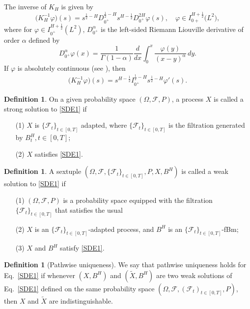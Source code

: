 \documentclass[numbers,compress,v1.0.1]{vmsta}
\theoremstyle{definition}
\newtheorem{definition}[theorem]{Definition}
\begin{document}
The inverse of $K_H$ is given by
%
\[
\bigl(K_H^{-1} \varphi\bigr) (s) = s^{\frac{1}{2}-H}
D_{0^+}^{\frac{1}{2}-H} s^{H-\frac{1}{2}} D_{0^+}^{2H}
\varphi(s), \quad\varphi\in I_{0+}^{H+\frac{1}{2}}\bigl(L^2
\bigr),
\]
%
where for $\varphi\in I_{0^+}^{H+\frac{1}{2}} (L^2)$, $D_{0^+}^{\alpha
}$ is the left-sided Riemann Liouville derivative of order $\alpha$
defined by
%
\[
D_{0^+}^{\alpha} \varphi(x)= \frac{1}{\varGamma(1-\alpha)} \frac{d
}{d x}
\int_0^x \frac{\varphi(y)}{(x-y)^{\alpha}}\,dy.
\]
%
If $\varphi$ is absolutely continuous (see \cite{NO}), then
%
\begin{align}
\label{inverseKH} \bigl(K_H^{-1} \varphi\bigr) (s) =
s^{H-\frac{1}{2}} I_{0^+}^{\frac{1}{2}-H} s^{\frac{1}{2}-H}
\varphi'(s).
\end{align}
%
\begin{definition}
On a given probability space $(\varOmega, \mathcal{F}, P)$, a process $X$
is called a strong solution to \eqref{SDE1} if
%
\begin{itemize}
%
\item[\rm(1)] $X$ is $\{\mathcal{F}_t\}_{t\in[0,T]}$ adapted, where $\{
\mathcal{F}_t\}_{t\in[0,T]}$ is the filtration generated by $B^H_t,
t\!\in[0,T]$;

\item[\rm(2)] $X$ satisfies \eqref{SDE1}.
\end{itemize}
%
\end{definition}
%
\begin{definition}
A sextuple $(\varOmega, \mathcal{F}, \{\mathcal{F}_t\}_{t\in[0,T]}, P, X,
B^H )$ is called a weak solution to \eqref{SDE1} if
%
\begin{itemize}
%
\item[\rm(1)] $(\varOmega, \mathcal{F}, P)$ is a probability space
equipped with the filtration $\{\mathcal{F}_t\}_{t\in[0,T]}$ that
satisfies the usual 

\item[\rm(2)] $X$ is an $\{\mathcal{F}_t\}_{t\in[0,T]}$-adapted
process, and $B^H$ is an $\{\mathcal{F}_t\}_{t\in[0,T]}$-fBm;

\item[\rm(3)] $X$ and $B^H$ satisfy \eqref{SDE1}.
\end{itemize}
%
\end{definition}
%
\begin{definition}[Pathwise uniqueness]
We say that pathwise uniqueness holds for Eq.~\eqref{SDE1}
if whenever $(X,B^{H})$ and $(\widetilde{X},{B^{H}})$
are two weak solutions of Eq.~\eqref{SDE1} defined on the
same probability space $ (\varOmega,\mathcal{F},(\mathcal{F}_{t})_{t\in
[0,T]},P )$,
then $X$ and $\widetilde{X}$ are indistinguishable.
\end{definition}
\end{document}
